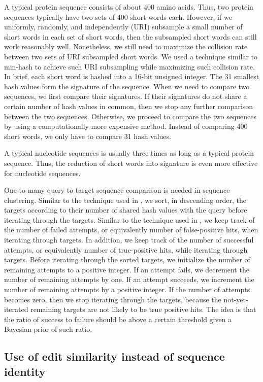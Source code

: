 \documentclass[11pt,letterpaper]{article}
\begin{document}
A typical protein sequence consists of about 400 amino acids.
Thus, two protein sequences typically have two sets of 400 short words each.
However, if we uniformly, randomly, and independently (URI) subsample a small number of short words in each set of short words, then the subsampled short words can still work reasonably well. 
Nonetheless, we still need to maximize the collision rate between two sets of URI subsampled short words.
We used a technique similar to min-hash to achieve such URI subsampling while maximizing such collision rate.
In brief, each short word is hashed into a 16-bit unsigned integer.
The 31 smallest hash values form the signature of the sequence.
When we need to compare two sequences, we first compare their signatures.
If their signatures do not share a certain number of hash values in common, then we stop any further comparison between the two sequences. 
Otherwise, we proceed to compare the two sequences by using a computationally more expensive method.
Instead of comparing 400 short words, we only have to compare 31 hash values.

A typical nucleotide sequences is usually three times as long as a typical protein sequence.
Thus, the reduction of short words into signature is even more effective for nucleotide sequences.

One-to-many query-to-target sequence comparison is needed in sequence clustering. 
Similar to the technique used in \citet{li2006cd}, we sort, in descending order, the targets according to their number of shared hash values with the query before iterating through the targets. 
Similar to the technique used in \citet{edgar2010search}, we keep track of the number of failed attempts, or equivalently number of false-positive hits, when iterating through targets.
In addition, we keep track of the number of successful attempts, or equivalently number of true-positive hits, while iterating through targets.
Before iterating through the sorted targets, we initialize the number of remaining attempts to a positive integer.
If an attempt fails, we decrement the number of remaining attempts by one.
If an attempt succeeds, we increment the number of remaining attempts by a positive integer.
If the number of attempts becomes zero, then we stop iterating through the targets, because the not-yet-iterated remaining targets are not likely to be true positive hits.
The idea is that the ratio of success to failure should be above a certain threshold given a Bayesian prior of such ratio.

\subsection{Use of edit similarity instead of sequence identity}
\end{document}
